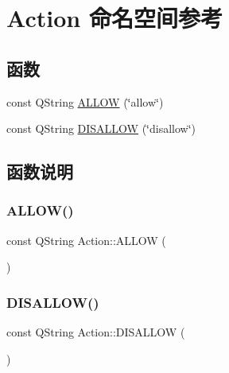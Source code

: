 \hypertarget{namespace_action}{}\section{Action 命名空间参考}
\label{namespace_action}
\subsection*{函数}
\begin{DoxyCompactItemize}
\item 
const Q\+String \mbox{\hyperlink{namespace_action_a019c221c4527d6eeea3ce813d6b495f4}{A\+L\+L\+OW}} (\char`\"{}allow\char`\"{})
\item 
const Q\+String \mbox{\hyperlink{namespace_action_a2bb645ed0b951fc53b6826276d5a6d7b}{D\+I\+S\+A\+L\+L\+OW}} (\char`\"{}disallow\char`\"{})
\end{DoxyCompactItemize}


\subsection{函数说明}
\mbox{\label{namespace_action_a019c221c4527d6eeea3ce813d6b495f4}} 
\subsubsection{\texorpdfstring{A\+L\+L\+O\+W()}{ALLOW()}}
{\footnotesize\ttfamily const Q\+String Action\+::\+A\+L\+L\+OW (\begin{DoxyParamCaption}\item[{\char`\"{}allow\char`\"{}}]{ }\end{DoxyParamCaption})}

\mbox{\label{namespace_action_a2bb645ed0b951fc53b6826276d5a6d7b}} 
\subsubsection{\texorpdfstring{D\+I\+S\+A\+L\+L\+O\+W()}{DISALLOW()}}
{\footnotesize\ttfamily const Q\+String Action\+::\+D\+I\+S\+A\+L\+L\+OW (\begin{DoxyParamCaption}\item[{\char`\"{}disallow\char`\"{}}]{ }\end{DoxyParamCaption})}

